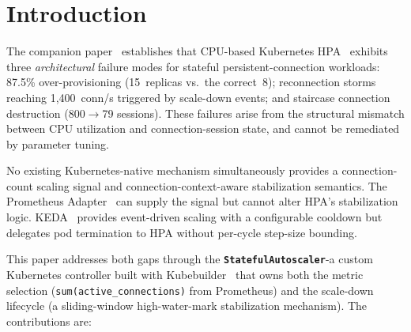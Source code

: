 \documentclass[3p,twocolumn]{elsarticle}
\theoremstyle{plain}%
\theoremstyle{definition}%
\begin{document}
\section{Introduction}
\label{sec:intro}

The companion paper~\cite{behera2026hpa} establishes that CPU-based Kubernetes HPA~\cite{k8s_hpa_docs} exhibits three \textit{architectural} failure modes for stateful persistent-connection workloads: 87.5\% over-provisioning (15~replicas vs.\ the correct~8); reconnection storms reaching 1,400~conn/s triggered by scale-down events; and staircase connection destruction (800$\to$79 sessions). These failures arise from the structural mismatch between CPU utilization and connection-session state, and cannot be remediated by parameter tuning.

No existing Kubernetes-native mechanism simultaneously provides a connection-count scaling signal and connection-context-aware stabilization semantics. The Prometheus Adapter~\cite{prometheus_adapter} can supply the signal but cannot alter HPA's stabilization logic. KEDA~\cite{keda_docs} provides event-driven scaling with a configurable cooldown but delegates pod termination to HPA without per-cycle step-size bounding.

This paper addresses both gaps through the \textbf{\texttt{StatefulAutoscaler}}-a custom Kubernetes controller built with Kubebuilder~\cite{kubebuilder_docs} that owns both the metric selection (\texttt{sum(active\_connections)} from Prometheus) and the scale-down lifecycle (a sliding-window high-water-mark stabilization mechanism). The contributions are:
\end{document}

